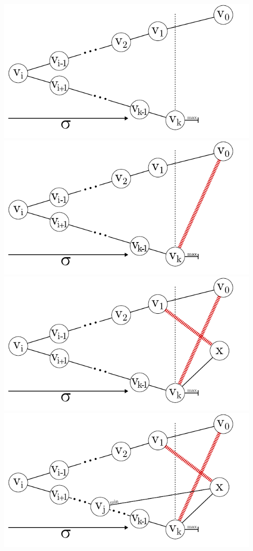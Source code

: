 \documentclass[xcolor=x11names,compress]{beamer}
\begin{document}
\begin{frame}
\begin{center}
\begin{overprint}
			\includegraphics[scale=1.0]{img/graph/q/01-03.pdf}
			\onslide<8>\includegraphics[scale=1.0]{img/graph/q/01-04.pdf}
			\onslide<9>\includegraphics[scale=1.0]{img/graph/q/01-05.pdf}
			\onslide<10>\includegraphics[scale=1.0]{img/graph/q/01-06.pdf}

\end{overprint}
\end{center}
\end{frame}
\end{document}
